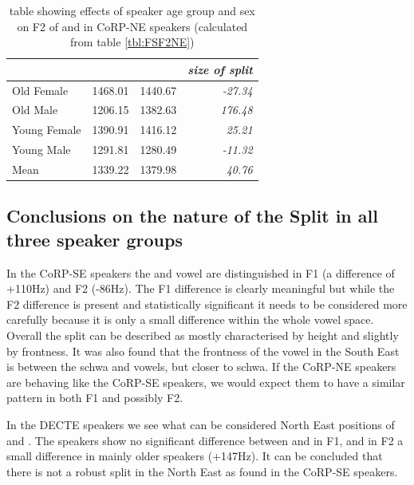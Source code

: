 \documentclass[../../../00.FullDoc/tex/ThesisSkeleton-draft2]{subfiles}
\begin{document}
\begin{table}[htbp]
	\centering
	\begin{tabular}{lrrr}
		\hline
		& \multicolumn{1}{l}{\foot{}} & \multicolumn{1}{l}{\strutt{}} & \multicolumn{1}{l}{\textit{size of split}} \\
		\hline
		Old Female & 1468.01 & 1440.67 & \textit{-27.34} \\
		Old Male & 1206.15 & 1382.63 & \textit{176.48} \\
		Young Female & 1390.91 & 1416.12 & \textit{25.21} \\
		Young Male & 1291.81 & 1280.49 & \textit{-11.32} \\
		Mean  & 1339.22 & 1379.98 & \textit{40.76} \\
		\hline
	\end{tabular}%
	\caption{table showing effects of speaker age group and sex on F2 of \foot{} and \strutt{} in CoRP-NE speakers (calculated from table \ref{tbl:FSF2NE})}
	\label{tbl:FSF2NEinter}
	\end{table}%


\subsection{Conclusions on the nature of the \FS{} Split in all three speaker groups}
In the CoRP-SE speakers the \foot{} and \strutt{} vowel are distinguished in F1 (a difference of +110Hz) and F2 (-86Hz). The F1 difference is clearly meaningful but while the F2 difference is present and statistically significant it needs to be considered more carefully because it is only a small difference within the whole vowel space. Overall the \FS split can be described as mostly characterised by height and slightly by frontness. It was also found that the frontness of the \strutt{} vowel in the South East is between the schwa and  vowels, but closer to schwa. If the CoRP-NE speakers are behaving like the CoRP-SE speakers, we would expect them to have a similar pattern in both F1 and possibly F2.

In the DECTE speakers we see what can be considered  North East \FS{} positions of \foot{} and \strutt{}. The speakers show no significant difference between \foot{} and \strutt{} in F1, and in F2 a small difference in mainly older speakers (+147Hz). It can be concluded that there is not a robust \FS{} split in the North East as found in the CoRP-SE speakers.
\end{document}
